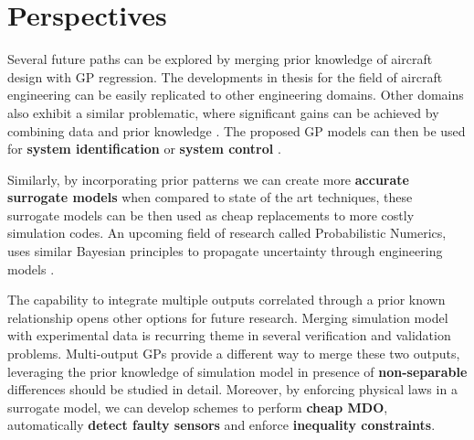 \section{Perspectives}
Several future paths can be explored by merging prior knowledge of aircraft design with GP regression. The developments in thesis for the field of aircraft engineering can be easily replicated to other engineering domains. Other domains also exhibit a similar problematic, where significant gains can be achieved by combining data and prior knowledge \cite{lookman2017statistical, jidling2017linearly, journals/jmlr/AlvarezLL09}. The proposed GP models can then be used for \textbf{system identification} or \textbf{system control} \cite{kocijan2016modelling, frigola2014variational, deisenroth2011pilco}. 


Similarly, by incorporating prior patterns we can create more \textbf{accurate surrogate models} when compared to state of the art techniques, these surrogate models can be then used as cheap replacements to more costly simulation codes. An upcoming field of research called Probabilistic Numerics, uses similar Bayesian principles to propagate uncertainty through engineering models \cite{2014arXiv14022058H}. 

The capability to integrate multiple outputs correlated through a prior known relationship opens other options for future research. Merging simulation model with experimental data is recurring theme in several verification and validation problems. Multi-output GPs provide a different way to merge these two outputs, leveraging the prior knowledge of simulation model in presence of \textbf{non-separable} differences should be studied in detail. Moreover, by enforcing physical laws in a surrogate model, we can develop schemes to perform \textbf{cheap MDO}, automatically \textbf{detect faulty sensors} and enforce \textbf{inequality constraints}. 

